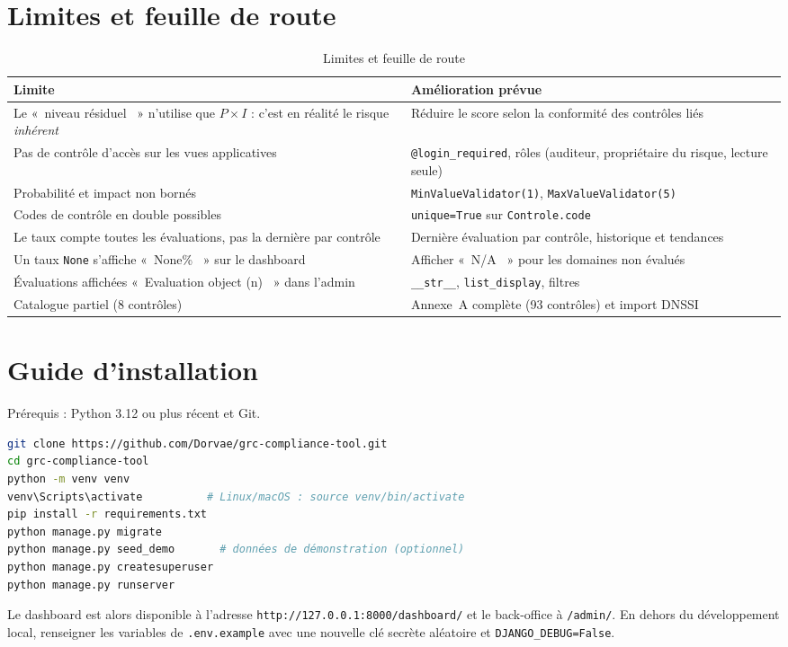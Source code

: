 \documentclass[11pt,a4paper]{article}
\providecommand{\og}{«~}\providecommand{\fg}{~»}
\newcommand{\code}[1]{\texttt{#1}}
\begin{document}
\section{Limites et feuille de route}
\begin{table}[H]
\centering\small
\begin{tabularx}{\linewidth}{@{}XX@{}}
\toprule
\textbf{Limite} & \textbf{Amélioration prévue}\\
\midrule
Le \og niveau résiduel \fg{} n'utilise que $P\times I$ : c'est en réalité le risque \emph{inhérent} & Réduire le score selon la conformité des contrôles liés\\
Pas de contrôle d'accès sur les vues applicatives & \code{@login\_required}, rôles (auditeur, propriétaire du risque, lecture seule)\\
Probabilité et impact non bornés & \code{MinValueValidator(1)}, \code{MaxValueValidator(5)}\\
Codes de contrôle en double possibles & \code{unique=True} sur \code{Controle.code}\\
Le taux compte toutes les évaluations, pas la dernière par contrôle & Dernière évaluation par contrôle, historique et tendances\\
Un taux \code{None} s'affiche \og None\% \fg{} sur le dashboard & Afficher \og N/A \fg{} pour les domaines non évalués\\
Évaluations affichées \og Evaluation object (n) \fg{} dans l'admin & \code{\_\_str\_\_}, \code{list\_display}, filtres\\
Catalogue partiel (8 contrôles) & Annexe~A complète (93 contrôles) et import DNSSI\\
\bottomrule
\end{tabularx}
\caption{Limites et feuille de route}
\end{table}

\section{Guide d'installation}
Prérequis : Python 3.12 ou plus récent et Git.
\begin{lstlisting}[language=bash]
git clone https://github.com/Dorvae/grc-compliance-tool.git
cd grc-compliance-tool
python -m venv venv
venv\Scripts\activate          # Linux/macOS : source venv/bin/activate
pip install -r requirements.txt
python manage.py migrate
python manage.py seed_demo       # données de démonstration (optionnel)
python manage.py createsuperuser
python manage.py runserver
\end{lstlisting}
Le dashboard est alors disponible à l'adresse \code{http://127.0.0.1:8000/dashboard/} et le back-office à \code{/admin/}. En dehors du développement local, renseigner les variables de \code{.env.example} avec une nouvelle clé secrète aléatoire et \code{DJANGO\_DEBUG=False}.
\end{document}
